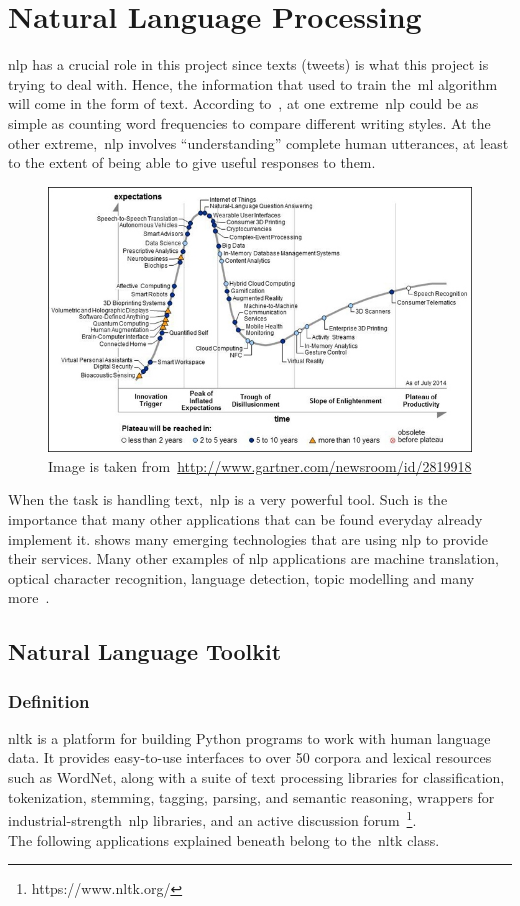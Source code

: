 \section{Natural Language Processing}
\ac{nlp} has a crucial role in this project since texts (tweets) is what this project is trying to deal with. Hence, the information that used to train the~\ac{ml} algorithm will come in the form of text. According to~\cite{bird2009natural}, at one extreme~\ac{nlp} could be as simple as counting word frequencies to compare different writing styles. At the other extreme,~\ac{nlp} involves ``understanding'' complete human utterances, at least to the extent of being able to give useful responses to them.\\
\begin{figure}
	\hspace{-1.45cm}
	\includegraphics[]{img/nlp.jpg}
	\caption{Image is taken from~\url{http://www.gartner.com/newsroom/id/2819918}}
	\label{fig:nlptech}
\end{figure}
When the task is handling text,~\ac{nlp} is a very powerful tool. Such is the importance that many other applications that can be found everyday already implement it.  shows many emerging technologies that are using \ac{nlp} to provide their services.
Many other examples of \ac{nlp} applications are machine translation, optical character recognition, language detection, topic modelling and many more~\cite{stopwords}.

\label{sec:NLP}
\subsection{Natural Language Toolkit}
\subsubsection{Definition}
\ac{nltk} is a platform for building Python programs to work with human language data. It provides easy-to-use interfaces to over 50 corpora and lexical resources such as WordNet, along with a suite of text processing libraries for classification, tokenization, stemming, tagging, parsing, and semantic reasoning, wrappers for industrial-strength~\ac{nlp} libraries, and an active discussion forum~\footnote{https://www.nltk.org/}.\\
The following applications explained beneath belong to the~\ac{nltk} class.
